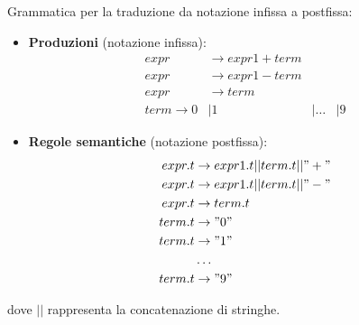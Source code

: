 \documentclass[a4paper]{article}
\begin{document}
\begin{example}
  Grammatica per la traduzione da notazione infissa a postfissa:
  \begin{itemize}
    \item \textbf{Produzioni} (notazione infissa):
      \[
        \begin{aligned}
          expr &\to expr1 + term \\
          expr &\to expr1 - term \\
          expr &\to term \\
          term \to 0 &| 1 &| \ldots &| 9
        \end{aligned}
      \] 

    \item \textbf{Regole semantiche} (notazione postfissa):
      \[
        \begin{aligned}
          expr.t &\to expr1.t || term.t || "+" \\
          expr.t &\to expr1.t || term.t || "-" \\
          expr.t &\to term.t \\
          term.t &\to "0" \\
          term.t &\to "1" \\
                 &\ldots \\
          term.t &\to "9"
        \end{aligned}
      \] 
  \end{itemize}
  dove \( || \) rappresenta la concatenazione di stringhe.
\end{example}
\end{document}

